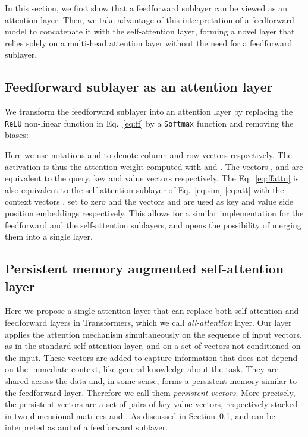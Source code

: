 \documentclass{article}
\newcommand{\secc}[1]{Section~\ref{sec:#1}}
\newcommand{\eq}[1]{Eq.~\ref{eq:#1}}
\begin{document}
In this section, we first show that a feedforward sublayer can be viewed as an attention layer.
Then, we take advantage of this interpretation of a feedforward model to concatenate it with the self-attention layer, forming a novel layer that relies solely on a multi-head attention layer without the need for a feedforward sublayer.

\subsection{Feedforward sublayer as an attention layer}\label{sec:ffattn}

We transform the feedforward sublayer into an attention layer by replacing the \texttt{ReLU} non-linear function in \eq{ff} by a \texttt{Softmax} function and removing the biases:

Here we use notations  and  to denote column and row vectors respectively.
The activation  is thus the attention weight computed with  and .
The vectors ,  and  are equivalent to the query, key and value vectors respectively.
The \eq{ffattn} is also equivalent to the self-attention sublayer of Eq.~\ref{eq:sim}-\ref{eq:att} with the context vectors ,  set to zero and the vectors  and  are used as key and value side position embeddings respectively.
This allows for a similar implementation for the feedforward and the self-attention sublayers, and opens the possibility of merging them into a single layer.


\subsection{Persistent memory augmented self-attention layer}
Here we propose a single attention layer that can replace both self-attention and feedforward layers in Transformers, which we call \emph{all-attention} layer.
Our layer applies the attention mechanism simultaneously on the sequence of input vectors, as in the standard self-attention layer, and on a set of vectors not conditioned on the input.
These vectors are added to capture information that does not depend on the immediate context, like general knowledge about the task.
They are shared across the data and, in some sense, forms a persistent memory similar to the feedforward layer. Therefore we call them \emph{persistent vectors}.
More precisely, the persistent vectors are a set of  pairs of key-value vectors, respectively stacked in two  dimensional matrices  and .
As discussed in \secc{ffattn},  and  can be interpreted as  and  of a feedforward sublayer.
\end{document}
